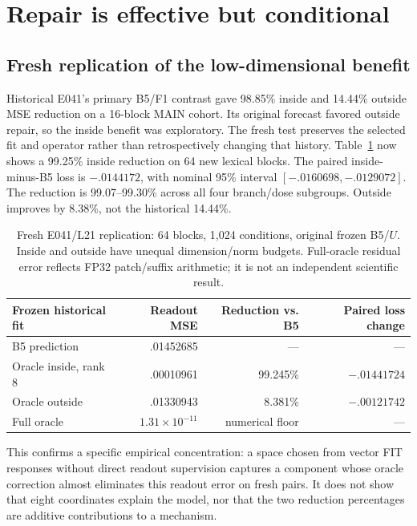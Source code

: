 \section{Repair is effective but conditional}
\subsection{Fresh replication of the low-dimensional benefit}\label{sec:l21results}
Historical E041's primary B5/F1 contrast gave 98.85\% inside and 14.44\% outside MSE reduction on a 16-block MAIN cohort. Its original forecast favored outside repair, so the inside benefit was exploratory. The fresh test preserves the selected fit and operator rather than retrospectively changing that history. Table~\ref{tab:l21} now shows a 99.25\% inside reduction on 64 new lexical blocks. The paired inside-minus-B5 loss is $-.0144172$, with nominal 95\% interval $[-.0160698,-.0129072]$. The reduction is 99.07--99.30\% across all four branch/dose subgroups. Outside improves by 8.38\%, not the historical 14.44\%.

\begin{table}[ht]\centering\small
\begin{tabular}{lrrr}\toprule
Frozen historical fit & Readout MSE & Reduction vs. B5 & Paired loss change\\\midrule
B5 prediction & .01452685 & --- & ---\\
Oracle inside, rank 8 & .00010961 & 99.245\% & $-.01441724$\\
Oracle outside & .01330943 & 8.381\% & $-.00121742$\\
Full oracle & $1.31\times10^{-11}$ & numerical floor & ---\\
\bottomrule\end{tabular}
\caption{Fresh E041/L21 replication: 64 blocks, 1,024 conditions, original frozen B5/$U$. Inside and outside have unequal dimension/norm budgets. Full-oracle residual error reflects FP32 patch/suffix arithmetic; it is not an independent scientific result.}\label{tab:l21}
\end{table}

This confirms a specific empirical concentration: a space chosen from vector FIT responses without direct readout supervision captures a component whose oracle correction almost eliminates this readout error on fresh pairs. It does not show that eight coordinates explain the model, nor that the two reduction percentages are additive contributions to a mechanism.

